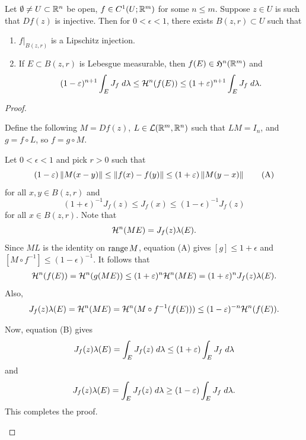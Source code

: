 \documentclass[a4paper]{article}
\begin{document}
\begin{lemma}
Let $\emptyset \neq U \subset \mathbb{R}^n$ be open, $f \in C^1 (U ; \mathbb{R}^m)$
for some $n \leq m$. Suppose $z \in U$ is such that
$Df(z)$ is injective. Then for $0 < \epsilon < 1$, there
exists $B(z, r) \subset U$ such that
\begin{enumerate}
\item $f \vert_{B(z, r)}$ is a Lipschitz injection.
\item If $E \subset B(z, r)$ is Lebesgue measurable,
then $f(E) \in \mathfrak{H}^n (\mathbb{R}^m)$ and
\[
(1 - \varepsilon)^{n+1}
\int_E J_f \; d \lambda
\leq \mathcal{H}^n (f(E)) \leq
(1 + \varepsilon)^{n+1} \int_E J_f \; d \lambda.
\]
\end{enumerate}
\end{lemma}

\begin{proof}
\begin{enumerate}
Define the following $M = Df(z)$, $L \in \mathcal{L}(\mathbb{R}^m, \mathbb{R}^n)$
such that $L M = I_n$, and $g = f \circ L$, so $f = g \circ M$.

Let $0 < \epsilon < 1$ and pick $r > 0$ such that
\begin{equation*}
  (1 - \varepsilon) \left\lVert M (x - y)\right\rVert
  \leq \left\lVert f(x) - f(y)\right\rVert \leq
  (1 + \varepsilon) \left\lVert M (y - x)\right\rVert
  \tag{A}
\end{equation*}
for all $x, y \in B(z, r)$
and
\begin{equation*}
  (1 + \epsilon)^{-1} J_f(z)
  \leq J_f(x) \leq
  (1 - \epsilon)^{-1} J_f(z)
  \tag{B}
\end{equation*}
for all $x \in B(z, r)$. Note that
\[
\mathcal{H}^n (ME) = J_f(z) \lambda(E).
\]
Since $ML$ is the identity on $\operatorname{range} M$,
equation (A) gives $[g] \leq 1 + \epsilon$ and
$[M \circ f^{-1}] \leq (1 - \epsilon)^{-1}$.
It follows that
\[
\begin{aligned}
\mathcal{H}^n (f(E)) = \mathcal{H}^n(g(ME))
\leq (1 + \varepsilon)^n \mathcal{H}^n (ME)
= (1 + \varepsilon)^n J_f(z) \lambda(E).
\end{aligned}
\]
Also,
\[
J_f(z) \lambda (E) = \mathcal{H}^n (ME)
= \mathcal{H}^n (M \circ f^{-1} (f(E)))
\leq (1 - \varepsilon)^{-n} \mathcal{H}^n (f(E)).
\]

Now, equation (B) gives
\[
J_f(z) \lambda(E)
= \int_E J_f(z) \; d \lambda
\leq (1 + \varepsilon) \int_E J_f \; d \lambda
\]
and
\[
J_f(z) \lambda(E)
= \int_E J_f(z) \; d \lambda
\geq (1 - \varepsilon) \int_E J_f \; d \lambda.
\]
This completes the proof.

\end{enumerate}
\end{proof}
\end{document}
